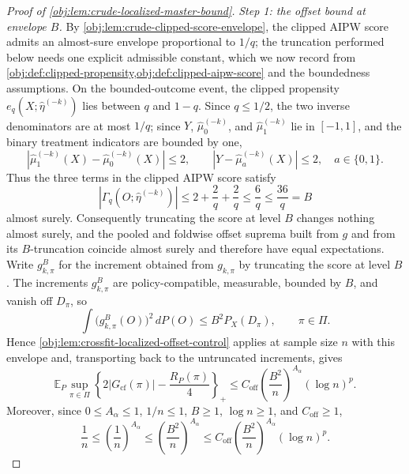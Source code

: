 \documentclass[11pt]{article}
\begin{document}
\begin{proof}[Proof of \cref{obj:lem:crude-localized-master-bound}]
\emph{Step 1: the offset bound at envelope \(B\).}  By \cref{obj:lem:crude-clipped-score-envelope}, the clipped AIPW score admits an almost-sure envelope proportional to \(1/q\); the truncation performed below needs one explicit admissible constant, which we now record from \cref{obj:def:clipped-propensity,obj:def:clipped-aipw-score} and the boundedness assumptions.  On the bounded-outcome event, the clipped propensity \(e_q(X;\widehat\eta^{(-k)})\) lies between \(q\) and \(1-q\).  Since \(q\le1/2\), the two inverse denominators are at most \(1/q\); since \(Y\), \(\widehat\mu_0^{(-k)}\), and \(\widehat\mu_1^{(-k)}\) lie in \([-1,1]\), and the binary treatment indicators are bounded by one,
\[
\left|\widehat\mu_1^{(-k)}(X)-\widehat\mu_0^{(-k)}(X)\right|\le2,
\qquad
\left|Y-\widehat\mu_a^{(-k)}(X)\right|\le2,
\quad a\in\{0,1\}.
\]
Thus the three terms in the clipped AIPW score satisfy
\[
\left|\Gamma_q\!\left(O;\widehat\eta^{(-k)}\right)\right|
\le 2+\frac2q+\frac2q
\le \frac6q
\le \frac{36}{q}=B
\]
almost surely.  Consequently truncating the score at level \(B\) changes nothing almost surely, and the pooled and foldwise offset suprema built from \(g\) and from its \(B\)-truncation coincide almost surely and therefore have equal expectations. %
Write \(g^B_{k,\pi}\) for the increment obtained from \(g_{k,\pi}\) by truncating the score at level \(B\).  The increments \(g^B_{k,\pi}\) are policy-compatible, measurable, bounded by \(B\), and vanish off \(D_\pi\), so
\[
\int \bigl(g^B_{k,\pi}(O)\bigr)^2\,dP(O)\le B^2P_X(D_\pi),
\qquad \pi\in\Pi .
\]
Hence \cref{obj:lem:crossfit-localized-offset-control} applies at sample size \(n\) with this envelope and, transporting back to the untruncated increments, gives
\[
\mathbb E_P\sup_{\pi\in\Pi}\left\{2|G_{\mathrm{cf}}(\pi)|-\frac{R_P(\pi)}4\right\}_+
\le
C_{\mathrm{off}}\left(\frac{B^2}{n}\right)^{A_\alpha}(\log n)^p .
\]
Moreover, since \(0\le A_\alpha\le1\), \(1/n\le1\), \(B\ge1\), \(\log n\ge1\), and \(C_{\mathrm{off}}\ge1\),
\[
\frac1n\le\left(\frac1n\right)^{A_\alpha}\le\left(\frac{B^2}{n}\right)^{A_\alpha}
\le C_{\mathrm{off}}\left(\frac{B^2}{n}\right)^{A_\alpha}(\log n)^p .
\]


\end{proof}
\end{document}
